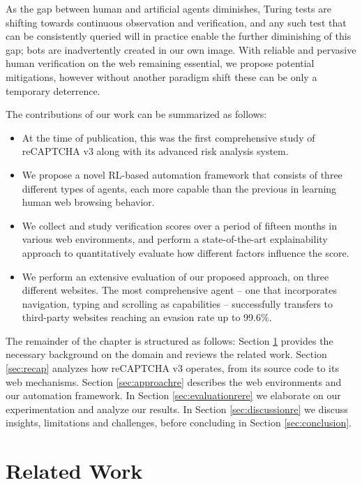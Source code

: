 As the gap between human and artificial agents diminishes, Turing tests are shifting towards continuous observation and verification, and any such test that can be consistently queried will in practice enable the further diminishing of this gap; bots are inadvertently created in our own image.
With reliable and pervasive human verification on the web remaining essential, we propose potential mitigations, however without another paradigm shift these can be only a temporary deterrence.

The contributions of our work can be summarized as follows:
\begin{itemize}
\item At the time of publication, this was the first comprehensive study of reCAPTCHA v3 along with its advanced risk analysis system.
\item We propose a novel RL-based automation framework that consists of three different types of agents, each more capable than the previous in learning human web browsing behavior.
\item We collect and study verification scores over a period of fifteen months in various web environments, and perform a state-of-the-art explainability approach to quantitatively evaluate how different factors influence the score.
\item We perform an extensive evaluation of our proposed approach, on three different websites.
The most comprehensive agent -- one that incorporates navigation, typing and scrolling as capabilities -- successfully transfers to third-party websites reaching an evasion rate up to 99.6\%.
\end{itemize}

The remainder of the chapter is structured as follows:
Section \ref{sec:related} provides the necessary background on the domain and reviews the related work.
Section \ref{sec:recap} analyzes how reCAPTCHA v3 operates, from its source code to its web mechanisms.
Section \ref{sec:approachre} describes the web environments and our automation framework.
In Section \ref{sec:evaluationrere} we elaborate on our experimentation and analyze our results.
In Section \ref{sec:discussionre} we discuss insights, limitations and challenges, before concluding in Section \ref{sec:conclusion}.

\section{Related Work}
\label{sec:related}

